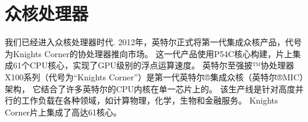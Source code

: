 
\chapter{众核处理器}
我们已经进入众核处理器时代\cite{MaWang:APCCAS'14}.
2012年，英特尔正式将第一代集成众核产品，代号为Knights Corner的协处理器推向市场。
这一代产品使用P54C核心构建，片上集成61个CPU核心，实现了GPU级别的浮点运算速度。
英特尔至强披™协处理器X100系列（代号为“Knights Corner”）是第一代英特尔®集成众核（英特尔®MIC）架构，
它结合了许多英特尔的CPU内核在单一芯片上的。
该生产线是针对高度并行的工作负载在各种领域，如计算物理，化学，生物和金融服务。
Knights Corner片上集成了高达61核心。